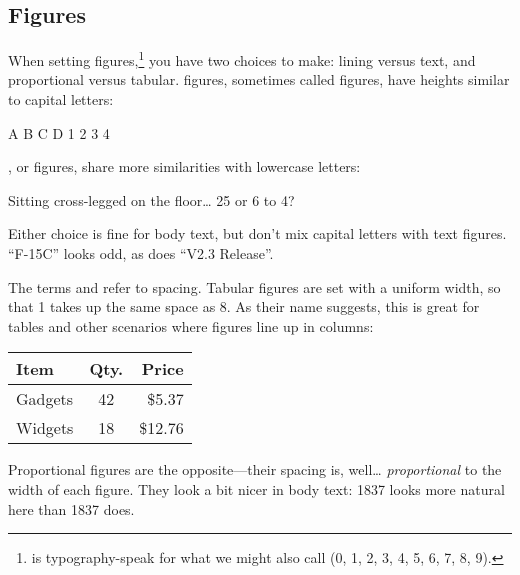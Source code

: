\subsection{Figures}

When setting figures,\punckern\footnote{%
 is typography-speak for what we might also call
 (0, 1, 2, 3, 4, 5, 6, 7, 8, 9).}
you have two
choices to make: lining versus text,
and proportional versus tabular.
 figures, sometimes called  figures,
have heights similar to capital letters:
\begin{leftfigure}
A B C D 1 2 3 4
\end{leftfigure}
, or  figures,
share more similarities with lowercase letters:
\begin{leftfigure}
Sitting cross-legged on the floor\dots{} 25 or 6 to 4?
\end{leftfigure}
Either choice is fine for body text, but don't mix capital letters with
text figures.
``F-15C'' looks odd, as does ``V2.3 Release''\quotekern.

{
The terms  and  refer to spacing.
Tabular figures are set with a uniform width, so that 1 takes up
the same space as 8.
As their name suggests, this is great for tables and other scenarios
where figures line up in columns:}
\begin{leftfigure}
\begin{tabular}{l|c r}
Item & Qty. & Price \\
\hline
Gadgets & 42 & \$5.37 \\
Widgets & 18 & \$12.76 \\
\end{tabular}
\end{leftfigure}
Proportional figures are the opposite---their spacing is, well\dots{}
\emph{proportional} to the width of each figure.
They look a bit nicer in body text: 1837
looks more natural here than
{1837} does.

